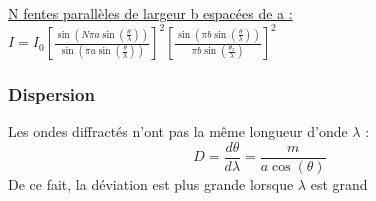 \documentclass[../main.tex]{subfiles}
\begin{document}
\quad \underline{N fentes parallèles de largeur b espacées de a :}\\
$I = I_0 [\frac{\sin{(N\pi a \sin{(\frac{\theta}{\lambda})})}}{\sin(\pi a \sin{(\frac{\theta}{\lambda})})}]^2 [\frac{\sin{(\pi b \sin{(\frac{\theta}{\lambda})})}}{\pi b \sin{(\frac{\theta_x}{\lambda})}}]^2$\\

\subsubsection{Dispersion}
Les ondes diffractés n'ont pas la même longueur d'onde $\lambda$ : \\
\begin{equation}
    D = \frac{d\theta}{d\lambda} = \frac{m}{a\cos(\theta)}
\end{equation}
De ce fait, la déviation est plus grande lorsque $\lambda$ est grand\\
\end{document}
